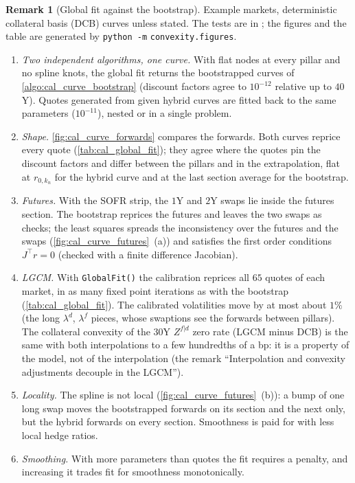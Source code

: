 \documentclass[11pt,english]{amsart}
\theoremstyle{definition}
\newtheorem{rema}{Remark}
\begin{document}
\begin{rema}[Global fit against the bootstrap]\label{rema:cal_global_vs_bootstrap}
Example markets, deterministic collateral basis (DCB) curves unless stated. The tests are in ; the figures and the table are generated by \texttt{python -m} \texttt{convexity.figures}.
\begin{enumerate}
\item \emph{Two independent algorithms, one curve.} With flat nodes at every pillar and no spline knots, the global fit returns the bootstrapped curves of \autoref{algo:cal_curve_bootstrap} (discount factors agree to $10^{-12}$ relative up to $40$Y). Quotes generated from given hybrid curves are fitted back to the same parameters ($10^{-11}$), nested or in a single problem.
\item \emph{Shape.} \autoref{fig:cal_curve_forwards} compares the forwards. Both curves reprice every quote (\autoref{tab:cal_global_fit}); they agree where the quotes pin the discount factors and differ between the pillars and in the extrapolation, flat at $r_{0,k_n}$ for the hybrid curve and at the last section average for the bootstrap.
\item \emph{Futures.} With the SOFR strip, the $1$Y and $2$Y swaps lie inside the futures section. The bootstrap reprices the futures and leaves the two swaps as checks; the least squares spreads the inconsistency over the futures and the swaps (\autoref{fig:cal_curve_futures}~(a)) and satisfies the first order conditions $J^\top r = 0$ (checked with a finite difference Jacobian).
\item \emph{LGCM.} With \texttt{GlobalFit()} the calibration reprices all $65$ quotes of each market, in as many fixed point iterations as with the bootstrap (\autoref{tab:cal_global_fit}). The calibrated volatilities move by at most about $1\%$ (the long $\lambda^d$, $\lambda^f$ pieces, whose swaptions see the forwards between pillars). The collateral convexity of the $30$Y $Z^{f|d}$ zero rate (LGCM minus DCB) is the same with both interpolations to a few hundredths of a bp: it is a property of the model, not of the interpolation (the remark ``Interpolation and convexity adjustments decouple in the LGCM'').
\item \emph{Locality.} The spline is not local (\autoref{fig:cal_curve_futures}~(b)): a bump of one long swap moves the bootstrapped forwards on its section and the next only, but the hybrid forwards on every section. Smoothness is paid for with less local hedge ratios.
\item \emph{Smoothing.} With more parameters than quotes the fit requires a penalty, and increasing it trades fit for smoothness monotonically.

\end{enumerate}
\end{rema}
\end{document}
